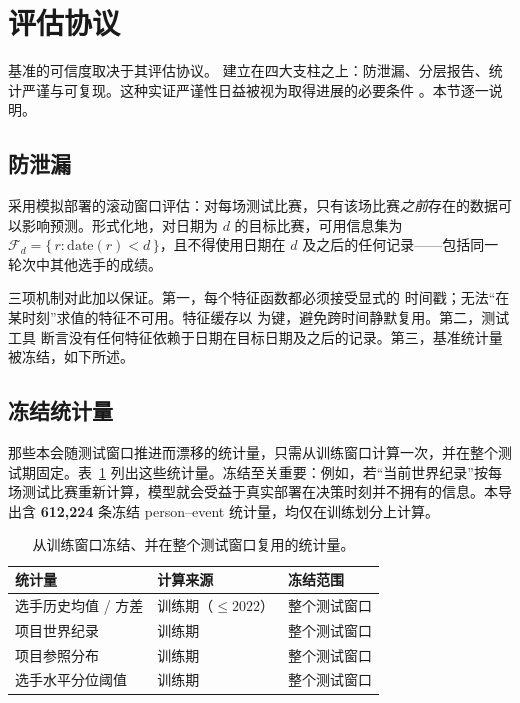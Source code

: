 \section{评估协议}
\label{sec:protocol}

基准的可信度取决于其评估协议。\wcabench{} 建立在四大支柱之上：防泄漏、分层报告、统计严谨与可复现。这种实证严谨性日益被视为取得进展的必要条件 \citep{sculley_rigor}。本节逐一说明。

\subsection{防泄漏}
\label{sec:protocol-leakage}

\wcabench{} 采用模拟部署的滚动窗口评估：对每场测试比赛，只有该场比赛\emph{之前}存在的数据可以影响预测。形式化地，对日期为 $d$ 的目标比赛，可用信息集为 $\mathcal{F}_d = \{\, r : \mathrm{date}(r) < d \,\}$，且不得使用日期在 $d$ 及之后的任何记录——包括同一轮次中其他选手的成绩。

三项机制对此加以保证。第一，每个特征函数都必须接受显式的 \asof{} 时间戳；无法“在某时刻”求值的特征不可用。特征缓存以 \asof{} 为键，避免跨时间静默复用。第二，测试工具  断言没有任何特征依赖于日期在目标日期及之后的记录。第三，基准统计量被冻结，如下所述。

\subsection{冻结统计量}
\label{sec:protocol-frozen}

那些本会随测试窗口推进而漂移的统计量，只需从训练窗口计算一次，并在整个测试期固定。表~\ref{tab:frozen} 列出这些统计量。冻结至关重要：例如，若“当前世界纪录”按每场测试比赛重新计算，模型就会受益于真实部署在决策时刻并不拥有的信息。本导出含 \textbf{612{,}224} 条冻结 person--event 统计量，均仅在训练划分上计算。

\begin{table}[t]
  \centering
  \small
  \begin{threeparttable}
  \caption{从训练窗口冻结、并在整个测试窗口复用的统计量。}
  \label{tab:frozen}
  \begin{tabular}{@{}lll@{}}
    \toprule
    统计量 & 计算来源 & 冻结范围 \\
    \midrule
    选手历史均值 / 方差 & 训练期（$\le 2022$） & 整个测试窗口 \\
    项目世界纪录 & 训练期 & 整个测试窗口 \\
    项目参照分布 & 训练期 & 整个测试窗口 \\
    选手水平分位阈值 & 训练期 & 整个测试窗口 \\
    \bottomrule
  \end{tabular}
  \end{threeparttable}
\end{table}

